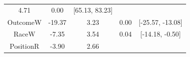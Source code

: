 \documentclass[12pt,twoside]{reedthesis}
\begin{document}
\begin{longtable}[]{@{}ccccc@{}}
\begin{minipage}[t]{0.15\columnwidth}
4.71\strut
\end{minipage} & \begin{minipage}[t]{0.15\columnwidth}\centering\strut
0.00\strut
\end{minipage} & \begin{minipage}[t]{0.17\columnwidth}\centering\strut
{[}65.13, 83.23{]}\strut
\end{minipage}\tabularnewline
\begin{minipage}[t]{0.25\columnwidth}\centering\strut
OutcomeW\strut
\end{minipage} & \begin{minipage}[t]{0.15\columnwidth}\centering\strut
-19.37\strut
\end{minipage} & \begin{minipage}[t]{0.15\columnwidth}\centering\strut
3.23\strut
\end{minipage} & \begin{minipage}[t]{0.15\columnwidth}\centering\strut
0.00\strut
\end{minipage} & \begin{minipage}[t]{0.17\columnwidth}\centering\strut
{[}-25.57, -13.08{]}\strut
\end{minipage}\tabularnewline
\begin{minipage}[t]{0.25\columnwidth}\centering\strut
RaceW\strut
\end{minipage} & \begin{minipage}[t]{0.15\columnwidth}\centering\strut
-7.35\strut
\end{minipage} & \begin{minipage}[t]{0.15\columnwidth}\centering\strut
3.54\strut
\end{minipage} & \begin{minipage}[t]{0.15\columnwidth}\centering\strut
0.04\strut
\end{minipage} & \begin{minipage}[t]{0.17\columnwidth}\centering\strut
{[}-14.18, -0.50{]}\strut
\end{minipage}\tabularnewline
\begin{minipage}[t]{0.25\columnwidth}\centering\strut
PositionR\strut
\end{minipage} & \begin{minipage}[t]{0.15\columnwidth}\centering\strut
-3.90\strut
\end{minipage} & \begin{minipage}[t]{0.15\columnwidth}\centering\strut
2.66\strut
\end{minipage} & \begin{minipage}[t]{0.15\columnwidth}\centering\strut

\end{minipage}
\end{longtable}
\end{document}
